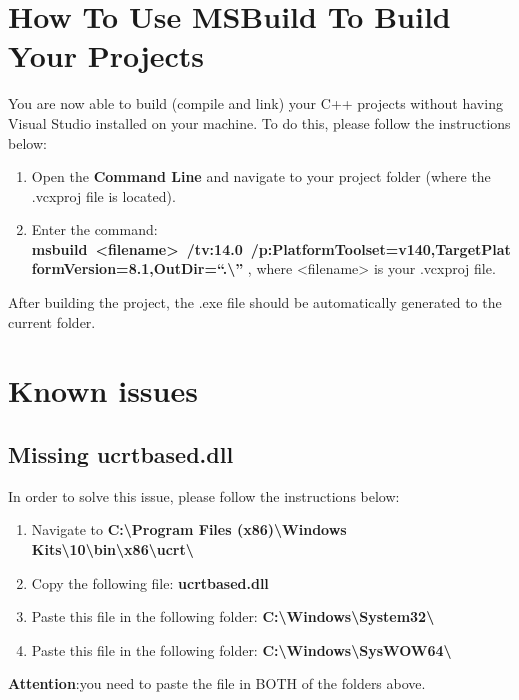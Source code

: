 \section{How To Use MSBuild To Build Your Projects}
  You are now able to build (compile and link) your C++ projects without having Visual Studio installed on your machine.
  To do this, please follow the instructions below:
  \begin{enumerate}
    \item Open the \textbf{Command Line} and navigate to your project folder (where the .vcxproj file is located).
    \item Enter the command:\\ \hbox{\textbf{msbuild <filename> /tv:14.0 /p:PlatformToolset=v140,TargetPlatformVersion=8.1,OutDir=``.\textbackslash{}''}} , where <filename> is your .vcxproj file.
  \end{enumerate}
  After building the project, the .exe file should be automatically generated to the current folder.
\section{Known issues}
  \subsection{Missing ucrtbased.dll}
  In order to solve this issue, please follow the instructions below:
  \begin{enumerate}
     \item Navigate to \textbf{C:\textbackslash{}Program Files (x86)\textbackslash{}Windows Kits\textbackslash{}10\textbackslash{}bin\textbackslash{}x86\textbackslash{}ucrt\textbackslash{}}
     \item Copy the following file: \textbf{ucrtbased.dll}
     \item Paste this file in the following folder: \textbf{C:\textbackslash{}Windows\textbackslash{}System32\textbackslash{}}
     \item Paste this file in the following folder: \textbf{C:\textbackslash{}Windows\textbackslash{}SysWOW64\textbackslash{}}
   \end{enumerate}
   \textbf{Attention}:you need to paste the file in BOTH of the folders above.

